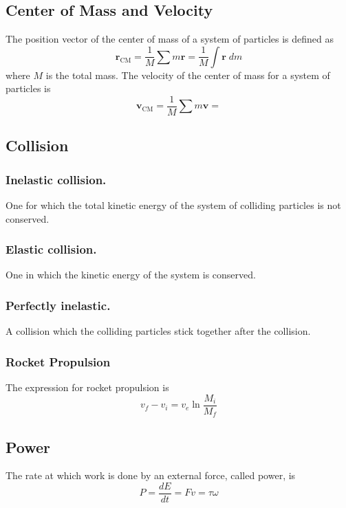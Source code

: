 \documentclass[../../../main.tex]{subfiles}
\begin{document}
\subsection*{Center of Mass and Velocity}
The position vector of the center of mass of a system of particles is defined as
\begin{equation*}
    \mathbf{r}_\text{CM}=\frac{1}{M}\sum m\mathbf{r}=\frac{1}{M}\int \mathbf{r}\;dm
\end{equation*}
where $M$ is the total mass. The velocity of the center of mass for a system of particles is
\begin{equation*}
    \mathbf{v}_\text{CM}=\frac{1}{M}\sum m\mathbf{v}=
\end{equation*}

\subsection*{Collision}
\subsubsection*{Inelastic collision.} One for which the total kinetic energy of the system of colliding particles is not conserved.

\subsubsection*{Elastic collision.} One in which the kinetic energy of the
system is conserved.

\subsubsection*{Perfectly inelastic.} A collision which the colliding particles stick together after the collision.

\subsubsection*{Rocket Propulsion} The expression for rocket propulsion
is 
\begin{equation*}
    v_f-v_i=v_e\ln\frac{M_i}{M_f}
\end{equation*}

\subsection*{Power}
The rate at which work is done by an external force, called power, is
\begin{equation*}
    P=\frac{dE}{dt}=Fv=\tau\omega
\end{equation*}
\end{document}
